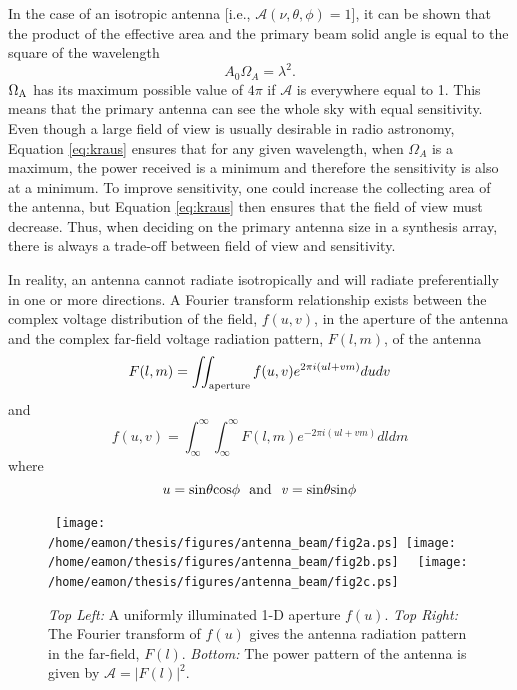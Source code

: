 In the case of an isotropic antenna [i.e., $\mathcal{A}(\nu,\theta,\phi)=1$], it can be shown that the product of the effective area and the primary beam solid angle is equal to the square of the wavelength \citep{kraus_1986}
\begin{equation}
A_{0}\Omega _{A} = \lambda ^2.
\label{eq:kraus}
\end{equation}
$\Omega _{\rm{A}}$ has its maximum possible value of $4\pi$ if $\mathcal{A}$ is everywhere equal to 1. This means that the primary antenna can see the whole sky with equal sensitivity. Even though a large field of view is usually desirable in radio astronomy, Equation \ref{eq:kraus} ensures that for any given wavelength, when $\Omega _{A}$ is a maximum, the power received is a minimum and therefore the sensitivity is also at a minimum. To improve sensitivity, one could increase the collecting area of the antenna, but Equation \ref{eq:kraus} then ensures that the field of view must decrease. Thus, when deciding on the primary antenna size in a synthesis array, there is always a trade-off between field of view and sensitivity. 

In reality, an antenna cannot radiate isotropically and will radiate preferentially in one or more directions. A Fourier transform relationship exists between the complex voltage distribution of the field, $f(u,v)$, in the aperture of the antenna and the complex far-field voltage radiation pattern, $F(l,m)$, of the antenna \citep{kraus_1986}
\begin{equation}
F(l,m)=\int\!\!\! \int _{\rm{aperture}} f(u,v)e^{2\pi i(ul+vm)}dudv
\end{equation}
and
\begin{equation}
f(u,v)=\int ^{\infty} _{\infty}\int ^{\infty} _{\infty} F(l,m)e^{-2\pi i(ul+vm)}dldm
\label{eq:illum1}
\end{equation}
where
\begin{equation}
u=\rm{sin}\theta \rm{cos}\phi \ \  \rm{and} \ \ \mathit{v}=\rm{sin}\theta \rm{sin}\phi
\label{eq:illum2}
\end{equation}

\begin{figure}[hbt!]
\centering 
\mbox{
          \texttt{[image: /home/eamon/thesis/figures/antenna\_beam/fig2a.ps]}
          \texttt{[image: /home/eamon/thesis/figures/antenna\_beam/fig2b.ps]}
          }
\mbox{
          \texttt{[image: /home/eamon/thesis/figures/antenna\_beam/fig2c.ps]}
          }
\caption[Radiation and power pattern of a uniformly illuminated antenna.]{\textit{Top Left:} A uniformly illuminated 1-D aperture $f(u)$. \textit{Top Right:} The Fourier transform of $f(u)$ gives the antenna radiation pattern in the far-field, $F(l)$. \textit{Bottom:} The power pattern of the antenna is given by $\mathcal{A}=|F(l)|^2$.}
\label{fig2a}
\end{figure}

